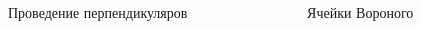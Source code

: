 \documentclass[pdf,hyperref={unicode}]{beamer}
\begin{document}
\begin{frame}
\begin{columns}
{
\begin{column}{0.3\linewidth}
\begin{figure}[h]
\caption{Проведение перпендикуляров}
\end{figure}
\end{column}
}

{
\begin{column}{0.3\linewidth}
\begin{figure}[h]
\caption{Ячейки Вороного}
\end{figure}
\end{column}
}


\end{columns}
\end{frame}
\end{document}
